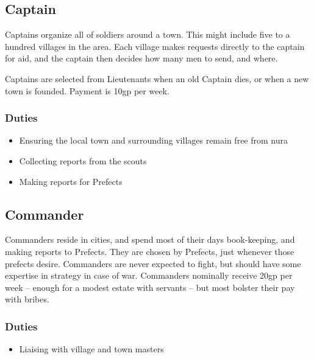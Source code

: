 \begin{multicols}{2}
\begin{itemize}
\end{itemize}

\subsection{Captain}

Captains organize all of soldiers around a town.
This might include five to a hundred villages in the area.
Each village makes requests directly to the captain for aid, and the captain then decides how many men to send, and where.

Captains are selected from Lieutenants when an old Captain dies, or when a new town is founded.
Payment is 10gp per week.

\subsubsection{Duties}

\begin{itemize}

  \item{Ensuring the local town and surrounding villages remain free from nura}
  \item{Collecting reports from the scouts}
  \item{Making reports for Prefects}

\end{itemize}

\subsection{Commander}

Commanders reside in cities, and spend most of their days book-keeping, and making reports to Prefects.
They are chosen by Prefects, just whenever those prefects desire.
Commanders are never expected to fight, but should have some expertise in strategy in case of war.
Commanders nominally receive 20gp per week -- enough for a modest estate with servants -- but most bolster their pay with bribes.

\subsubsection{Duties}

\begin{itemize}

  \item{Liaising with village and town masters}


\end{itemize}
\end{multicols}
